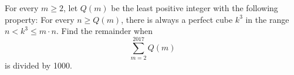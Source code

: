 For every $m \geq 2$,  let $Q(m)$ be the least positive integer with the following property: For every $n \geq Q(m)$,  there is always a perfect cube $k^3$ in the range $n < k^3 \leq m \cdot n$. Find the remainder when\[ \sum_{m = 2}^{2017} Q(m) \]is divided by 1000.